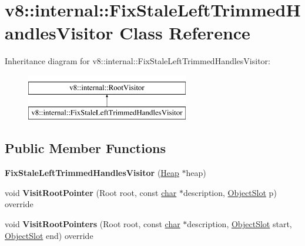 \hypertarget{classv8_1_1internal_1_1FixStaleLeftTrimmedHandlesVisitor}{}\section{v8\+:\+:internal\+:\+:Fix\+Stale\+Left\+Trimmed\+Handles\+Visitor Class Reference}
\label{classv8_1_1internal_1_1FixStaleLeftTrimmedHandlesVisitor}
Inheritance diagram for v8\+:\+:internal\+:\+:Fix\+Stale\+Left\+Trimmed\+Handles\+Visitor\+:\begin{figure}[H]
\begin{center}
\leavevmode
\includegraphics[height=2.000000cm]{classv8_1_1internal_1_1FixStaleLeftTrimmedHandlesVisitor}
\end{center}
\end{figure}
\subsection*{Public Member Functions}
\begin{DoxyCompactItemize}
\item 
\mbox{\label{classv8_1_1internal_1_1FixStaleLeftTrimmedHandlesVisitor_ab03b9fa976a7362e64ac20fce80974a1}} 
{\bfseries Fix\+Stale\+Left\+Trimmed\+Handles\+Visitor} (\mbox{\hyperlink{classv8_1_1internal_1_1Heap}{Heap}} $\ast$heap)
\item 
\mbox{\label{classv8_1_1internal_1_1FixStaleLeftTrimmedHandlesVisitor_aa076bd4a786dc851f4f60f59a310457a}} 
void {\bfseries Visit\+Root\+Pointer} (Root root, const \mbox{\hyperlink{classchar}{char}} $\ast$description, \mbox{\hyperlink{classv8_1_1internal_1_1ObjectSlot}{Object\+Slot}} p) override
\item 
\mbox{\label{classv8_1_1internal_1_1FixStaleLeftTrimmedHandlesVisitor_ac53edb54581475496fdab04e23dbbe2b}} 
void {\bfseries Visit\+Root\+Pointers} (Root root, const \mbox{\hyperlink{classchar}{char}} $\ast$description, \mbox{\hyperlink{classv8_1_1internal_1_1ObjectSlot}{Object\+Slot}} start, \mbox{\hyperlink{classv8_1_1internal_1_1ObjectSlot}{Object\+Slot}} end) override
\end{DoxyCompactItemize}
